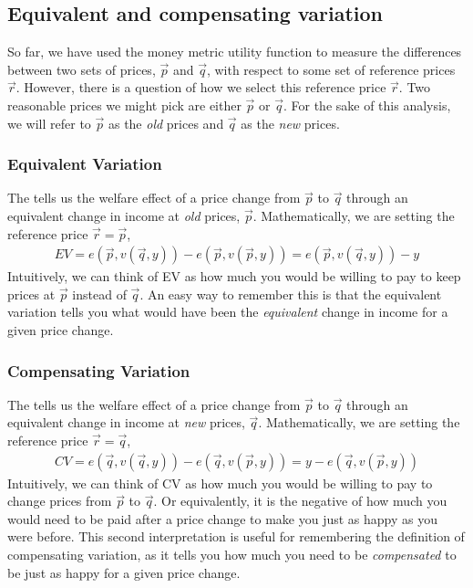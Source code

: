 \subsection*{Equivalent and compensating variation}
So far, we have used the money metric utility function to measure the differences between two sets of prices, $\vec{p}$ and $\vec{q}$, with respect to some set of reference prices $\vec{r}$. However, there is a question of how we select this reference price $\vec{r}$. Two reasonable prices we might pick are either $\vec{p}$ or $\vec{q}$. For the sake of this analysis, we will refer to $\vec{p}$ as the \emph{old} prices and $\vec{q}$ as the \emph{new} prices.

\subsubsection*{Equivalent Variation}
The  tells us the welfare effect of a price change from $\vec{p}$ to $\vec{q}$ through an equivalent change in income at \emph{old} prices, $\vec{p}$. Mathematically, we are setting the reference price $\vec{r} = \vec{p}$,
\begin{align*}
    EV = e(\vec{p}, v(\vec{q}, y)) - e(\vec{p}, v(\vec{p}, y)) = e(\vec{p}, v(\vec{q}, y)) - y
\end{align*}
Intuitively, we can think of EV as how much you would be willing to pay to keep prices at $\vec{p}$ instead of $\vec{q}$. An easy way to remember this is that the equivalent variation tells you what would have been the \emph{equivalent} change in income for a given price change.

\subsubsection*{Compensating Variation}
The  tells us the welfare effect of a price change from $\vec{p}$ to $\vec{q}$ through an equivalent change in income at \emph{new} prices, $\vec{q}$. Mathematically, we are setting the reference price $\vec{r} = \vec{q}$,
\begin{align*}
    CV = e(\vec{q}, v(\vec{q}, y)) - e(\vec{q}, v(\vec{p}, y)) = y - e(\vec{q}, v(\vec{p}, y))
\end{align*}
Intuitively, we can think of CV as how much you would be willing to pay to change prices from $\vec{p}$ to $\vec{q}$. Or equivalently, it is the negative of how much you would need to be paid after a price change to make you just as happy as you were before. This second interpretation is useful for remembering the definition of compensating variation, as it tells you how much you need to be \emph{compensated} to be just as happy for a given price change. 

